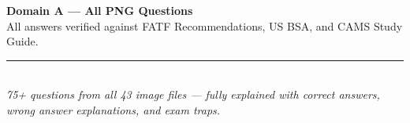 \documentclass[12pt,aspectratio=169]{beamer}
\begin{document}
	\begin{frame}
		\centering
		\vspace{1.5cm}
		{\fontsize{18}{22}\selectfont \textbf{Domain A — All PNG Questions}}\\[0.3cm]
		{\fontsize{12}{14}\selectfont All answers verified against FATF Recommendations, US BSA, and CAMS Study Guide.}\\[0.3cm]
		\rule{4cm}{0.5pt}\\[0.2cm]
		{\fontsize{9}{11}\selectfont \textit{75+ questions from all 43 image files — fully explained with correct answers,}\\
			\textit{wrong answer explanations, and exam traps.}}
		\vspace{0.5cm}
	\end{frame}
	
\end{document}
